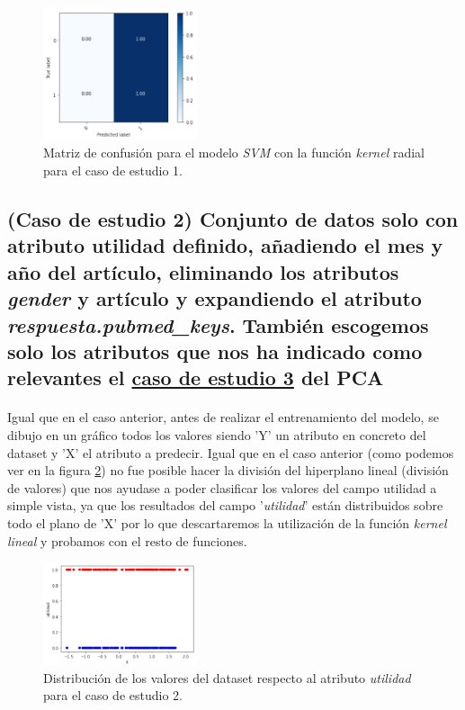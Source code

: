 {\begin{figure}[!htb]
  \centering
	\includegraphics[width=0.4\textwidth]{images/resultados_svm_cm_conjunto1.png}
	\caption{Matriz de confusión para el modelo \textit{SVM} con la función \textit{kernel} radial para el caso de estudio 1.}
  \label{svmCMCase1}
\end{figure}

\subsection{(Caso de estudio 2) Conjunto de datos solo con atributo utilidad definido, añadiendo el mes y año del artículo, eliminando los atributos \textit{gender} y artículo y expandiendo el atributo \textit{respuesta.pubmed\_keys}. También escogemos solo los atributos que nos ha indicado como relevantes el \hyperref[result:pca_case3]{caso de estudio 3} del PCA}

\paragraph{}
Igual que en el caso anterior, antes de realizar el entrenamiento del modelo, se dibujo en un gráfico todos los valores siendo 'Y' un atributo en concreto del dataset y 'X' el atributo a predecir. Igual que en el caso anterior (como podemos ver en la figura \ref{svmDistributionCase2}) no fue posible hacer la división del hiperplano lineal (división de valores) que nos ayudase a poder clasificar los valores del campo utilidad a simple vista, ya que los resultados del campo '\textit{utilidad}' están distribuidos sobre todo el plano de 'X' por lo que descartaremos la utilización de la función \textit{kernel} \textit{lineal} y probamos con el resto de funciones.

\begin{figure}[!htb]
  \centering
    \includegraphics[width=0.4\textwidth]{images/resultados_svm_distribucion_conjunto2.png}
    \caption{Distribución de los valores del dataset respecto al atributo \textit{utilidad} para el caso de estudio 2.}
  \label{svmDistributionCase2}
\end{figure}

}
